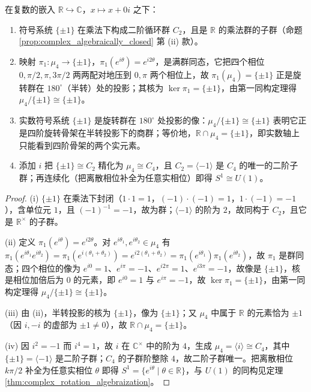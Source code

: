 \begin{proposition}\label{prop:sign_as_half_turn_projection}
在复数的嵌入 $\mathbb{R}\hookrightarrow\mathbb{C}$，$x\mapsto x+0i$ 之下：
\begin{enumerate}[label=(\roman*)]
    \item 符号系统 $\{\pm1\}$ 在乘法下构成二阶循环群 $C_2$，且是 $\mathbb{R}$ 的乘法群的子群（命题 \ref{prop:complex_algebraically_closed} 第 (ii) 款）。
    \item 映射 $\pi_1:\mu_4\to\{\pm1\}$，$\pi_1(e^{i\theta})=e^{i2\theta}$，是满群同态，它把四个相位 $0,\pi/2,\pi,3\pi/2$ 两两配对地压到 $0,\pi$ 两个相位上，故 $\pi_1(\mu_4)=\{\pm1\}$ 正是旋转群在 $180^\circ$（半转）处的投影；其核为 $\ker\pi_1=\{\pm1\}$，由第一同构定理得 $\mu_4/\{\pm1\}\cong\{\pm1\}$。
    \item 实数符号系统 $\{\pm1\}$ 是旋转群在 $180^\circ$ 处投影的像：$\mu_4/\{\pm1\}\cong\{\pm1\}$ 表明它正是四阶旋转骨架在半转投影下的商群；等价地，$\mathbb{R}\cap\mu_4=\{\pm1\}$，即实数轴上只能看到四阶骨架的两个实元素。
    \item 添加 $i$ 把 $\{\pm1\}\cong C_2$ 精化为 $\mu_4\cong C_4$，且 $C_2=\langle-1\rangle$ 是 $C_4$ 的唯一的二阶子群；再连续化（把离散相位补全为任意实相位）即得 $S^1\cong U(1)$。
\end{enumerate}
\end{proposition}

\begin{proof}
(i) $\{\pm1\}$ 在乘法下封闭（$1\cdot1=1$，$(-1)\cdot(-1)=1$，$1\cdot(-1)=-1$），含单位元 $1$，且 $(-1)^{-1}=-1$，故为群；$\langle-1\rangle$ 的阶为 $2$，故同构于 $C_2$，且它是 $\mathbb{R}^\times$ 的子群。

(ii) 定义 $\pi_1(e^{i\theta})=e^{i2\theta}$。对 $e^{i\theta_1},e^{i\theta_2}\in\mu_4$ 有 $\pi_1(e^{i\theta_1}e^{i\theta_2})=\pi_1(e^{i(\theta_1+\theta_2)})=e^{i2(\theta_1+\theta_2)}=\pi_1(e^{i\theta_1})\pi_1(e^{i\theta_2})$，故 $\pi_1$ 是群同态；四个相位的像为 $e^{i0}=1$、$e^{i\pi}=-1$、$e^{i2\pi}=1$、$e^{i3\pi}=-1$，故像是 $\{\pm1\}$，核是相位加倍后为 $0$ 的元素，即 $e^{i0}=1$ 与 $e^{i\pi}=-1$，故 $\ker\pi_1=\{\pm1\}$，由第一同构定理得 $\mu_4/\{\pm1\}\cong\{\pm1\}$。

(iii) 由 (ii)，半转投影的核为 $\{\pm1\}$，像为 $\{\pm1\}$；又 $\mu_4$ 中属于 $\mathbb{R}$ 的元素恰为 $\pm1$（因 $i,-i$ 的虚部为 $\pm1\neq0$），故 $\mathbb{R}\cap\mu_4=\{\pm1\}$。

(iv) 因 $i^2=-1$ 而 $i^4=1$，故 $i$ 在 $\mathbb{C}^{\times}$ 中的阶为 $4$，生成 $\mu_4=\langle i\rangle\cong C_4$，其中 $\{\pm1\}=\langle-1\rangle$ 是二阶子群；$C_4$ 的子群阶整除 $4$，故二阶子群唯一。把离散相位 $k\pi/2$ 补全为任意实相位 $\theta$ 即得 $S^1=\{e^{i\theta}\mid\theta\in\mathbb{R}\}$，与 $U(1)$ 的同构见定理 \ref{thm:complex_rotation_algebraization}。
\end{proof}

